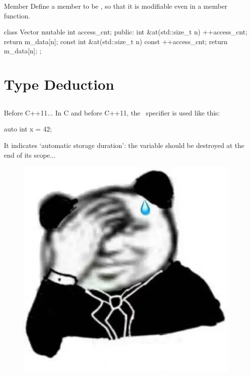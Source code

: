 \documentclass{beamer}
\begin{document}
\begin{frame}[fragile]{ Member}
    Define a member to be , so that it is modifiable even in a \const member function.
    \begin{cpp}
class Vector {
  mutable int access_cnt;
 public:
  int &at(std::size_t n) {
    ++access_cnt;
    return m_data[n];
  }
  const int &at(std::size_t n) const {
    ++access_cnt;
    return m_data[n];
  }
};
    \end{cpp}
\end{frame}

\section{Type Deduction}

\subsection{}

\newcommand{\auto}{\bluett{auto}~}

\begin{frame}[fragile]{Before C++11...}
    In C and before C++11, the \auto specifier is used like this:
    \begin{cpp}
auto int x = 42;
    \end{cpp}
    It indicates `automatic storage duration': the variable  should be destroyed at the end of its scope...
    \begin{figure}[h]
        \centering
        \includegraphics[scale=0.25]{img/stupid.png}
    \end{figure}
\end{frame}
\end{document}
